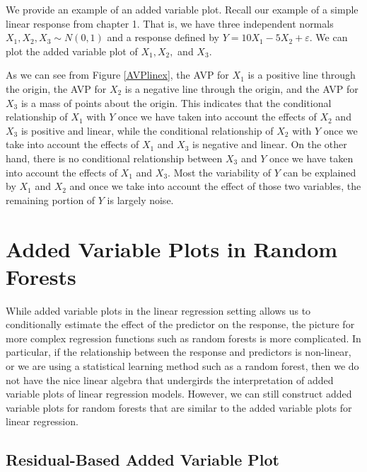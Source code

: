\documentclass[12pt,twoside]{reedthesis}
\theoremstyle{definition}
\theoremstyle{definition}
\theoremstyle{definition}
\theoremstyle{remark}
\begin{document}
We provide an example of an added variable plot. Recall our example of a
simple linear response from chapter 1. That is, we have three
independent normals \(X_1,X_2,X_3\sim N(0,1)\) and a response defined by
\(Y=10X_1-5X_2+\varepsilon.\) We can plot the added variable plot of
\(X_1, X_2,\) and \(X_3\). \par

As we can see from Figure \ref{AVPlinex}, the AVP for \(X_1\) is a
positive line through the origin, the AVP for \(X_2\) is a negative line
through the origin, and the AVP for \(X_3\) is a mass of points about
the origin. This indicates that the conditional relationship of \(X_1\)
with \(Y\) once we have taken into account the effects of \(X_2\) and
\(X_3\) is positive and linear, while the conditional relationship of
\(X_2\) with \(Y\) once we take into account the effects of \(X_1\) and
\(X_3\) is negative and linear. On the other hand, there is no
conditional relationship between \(X_3\) and \(Y\) once we have taken
into account the effects of \(X_1\) and \(X_3\). Most the variability of
\(Y\) can be explained by \(X_1\) and \(X_2\) and once we take into
account the effect of those two variables, the remaining portion of
\(Y\) is largely noise. \par

\section{Added Variable Plots in Random
Forests}\label{added-variable-plots-in-random-forests}

While added variable plots in the linear regression setting allows us to
conditionally estimate the effect of the predictor on the response, the
picture for more complex regression functions such as random forests is
more complicated. In particular, if the relationship between the
response and predictors is non-linear, or we are using a statistical
learning method such as a random forest, then we do not have the nice
linear algebra that undergirds the interpretation of added variable
plots of linear regression models. However, we can still construct added
variable plots for random forests that are similar to the added variable
plots for linear regression. \par

\subsection{Residual-Based Added Variable
Plot}\label{residual-based-added-variable-plot}
\end{document}

